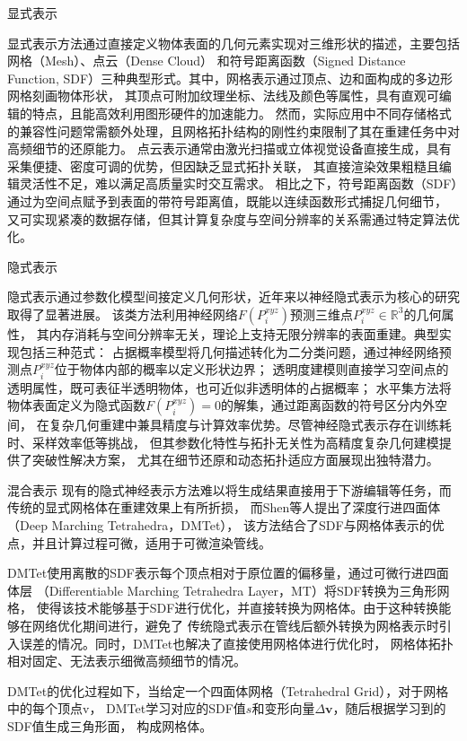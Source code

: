  显式表示

显式表示方法通过直接定义物体表面的几何元素实现对三维形状的描述，主要包括网格（Mesh）、点云（Dense Cloud）
和符号距离函数（Signed Distance Function, SDF）三种典型形式。其中，网格表示通过顶点、边和面构成的多边形网格刻画物体形状，
其顶点可附加纹理坐标、法线及颜色等属性，具有直观可编辑的特点，且能高效利用图形硬件的加速能力。
然而，实际应用中不同存储格式的兼容性问题常需额外处理，且网格拓扑结构的刚性约束限制了其在重建任务中对高频细节的还原能力。
点云表示通常由激光扫描或立体视觉设备直接生成，具有采集便捷、密度可调的优势，但因缺乏显式拓扑关联，
其直接渲染效果粗糙且编辑灵活性不足，难以满足高质量实时交互需求。
相比之下，符号距离函数（SDF）通过为空间点赋予到表面的带符号距离值，既能以连续函数形式捕捉几何细节，
又可实现紧凑的数据存储，但其计算复杂度与空间分辨率的关系需通过特定算法优化。

 隐式表示

隐式表示通过参数化模型间接定义几何形状，近年来以神经隐式表示为核心的研究取得了显著进展。
该类方法利用神经网络$F(P_i^{xyz})$预测三维点$P_i^{xyz}\in\mathbb{R}^3$的几何属性，
其内存消耗与空间分辨率无关，理论上支持无限分辨率的表面重建。典型实现包括三种范式：
占据概率模型将几何描述转化为二分类问题，通过神经网络预测点$P_i^{xyz}$位于物体内部的概率以定义形状边界；
透明度建模则直接学习空间点的透明属性，既可表征半透明物体，也可近似非透明体的占据概率；
水平集方法将物体表面定义为隐式函数$F(P_i^{xyz})=0$的解集，通过距离函数的符号区分内外空间，
在复杂几何重建中兼具精度与计算效率优势。尽管神经隐式表示存在训练耗时、采样效率低等挑战，
但其参数化特性与拓扑无关性为高精度复杂几何建模提供了突破性解决方案，
尤其在细节还原和动态拓扑适应方面展现出独特潜力。

 混合表示
现有的隐式神经表示方法难以将生成结果直接用于下游编辑等任务，而传统的显式网格体在重建效果上有所折损，
而Shen等人\cite{shen2021deep}提出了深度行进四面体（Deep Marching Tetrahedra，DMTet），
该方法结合了SDF与网格体表示的优点，并且计算过程可微，适用于可微渲染管线。

DMTet使用离散的SDF表示每个顶点相对于原位置的偏移量，通过可微行进四面体层
（Differentiable Marching Tetrahedra Layer，MT）将SDF转换为三角形网格，
使得该技术能够基于SDF进行优化，并直接转换为网格体。由于这种转换能够在网络优化期间进行，避免了
传统隐式表示在管线后额外转换为网格表示时引入误差的情况。同时，DMTet也解决了直接使用网格体进行优化时，
网格体拓扑相对固定、无法表示细微高频细节的情况。

DMTet的优化过程如下，当给定一个四面体网格（Tetrahedral Grid），对于网格中的每个顶点v，
DMTet学习对应的SDF值$s$和变形向量$\Delta\mathbf{v}$，随后根据学习到的SDF值生成三角形面，
构成网格体。

